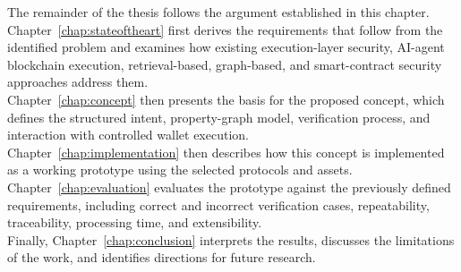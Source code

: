 The remainder of the thesis follows the argument established in this chapter.\\ Chapter~\ref{chap:stateoftheart} first derives the requirements that follow from the identified problem and examines how existing execution-layer security, AI-agent blockchain execution, retrieval-based, graph-based, and smart-contract security approaches address them. \\ Chapter~\ref{chap:concept} then presents the basis for the proposed concept, which defines the structured intent, property-graph model, verification process, and interaction with controlled wallet execution. \\Chapter~\ref{chap:implementation} then describes how this concept is implemented as a working prototype using the selected protocols and assets. \\Chapter~\ref{chap:evaluation} evaluates the prototype against the previously defined requirements, including correct and incorrect verification cases, repeatability, traceability, processing time, and extensibility. \\Finally, Chapter~\ref{chap:conclusion} interprets the results, discusses the limitations of the work, and identifies directions for future research.
